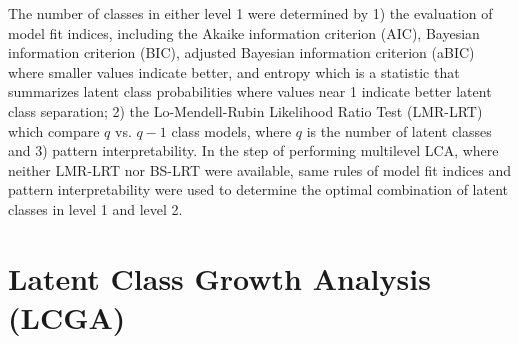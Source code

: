 The number of classes in either level 1 were determined by 1) the evaluation of model fit indices, including the Akaike information criterion (AIC), Bayesian information criterion (BIC), adjusted Bayesian information criterion (aBIC) where smaller values indicate better, and entropy which is a statistic that summarizes latent class probabilities where values near 1 indicate better latent class separation; 2) the Lo-Mendell-Rubin Likelihood Ratio Test (LMR-LRT) \parencite{lo2001testing, nylund2007deciding} which compare $q$ vs. $q-1$ class models, where $q$ is the number of latent classes and 3) pattern interpretability. In the step of performing multilevel LCA, where neither LMR-LRT nor BS-LRT were available, same rules of model fit indices and pattern interpretability were used to determine the optimal combination of latent classes in level 1 and level 2. 

\section{Latent Class Growth Analysis (LCGA)}\vspace{-0.3cm}
